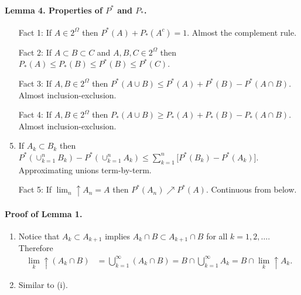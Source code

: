 \documentclass[10pt,letterpaper]{article}
\begin{document}
\paragraph{Lemma 4. Properties of $P^*$ and $P_*$.}
\begin{enumerate}
\item[Fact 1:] If $A\in 2^\Omega$ then $P^* (A) + P_*(A^c) = 1$. Almost the complement rule.
\item[Fact 2:]  If $A\subset B\subset C$ and $A, B, C\in2^\Omega$ then 
$P_* (A)\leq P_*(B)\leq P^*(B)\leq P^*(C)$.
\item[Fact 3:]  If $A, B\in 2^\Omega$ then $P^*(A\cup B)\leq P^*(A) + P^*(B) - P^*(A\cap B)$. Almost inclusion-exclusion.
\item[Fact 4:]  If $A, B\in 2^\Omega$ then $P_*(A\cup B)\geq P_*(A) + P_*(B) - P_*(A\cap B)$.  Almost inclusion-exclusion.
\item If $A_k\subset B_k$ then $P^*(\cup_{k=1}^n B_k) - P^*(\cup_{k=1}^n 
A_k)\leq \sum_{k=1}^n \bigl[P^*(B_k) - P^*(A_k)\bigr]$. Approximating unions term-by-term.
\item[Fact 5:] If $\lim_n\!\!\uparrow A_n= A$ then $P^*(A_n)\nearrow P^*(A)$. Continuous from below.
\end{enumerate}

\newpage
\paragraph{Proof of Lemma 1.}
\begin{enumerate}
\item
 Notice that $A_k \subset A_{k+1}$ implies $ A_k\cap B \subset A_{k+1}\cap B$ for all $k=1,2,\ldots$. Therefore
\begin{align*}
 \lim_k\!\!\uparrow (A_k\cap B) &= \bigcup_{k=1}^\infty (A_k\cap B) = B\cap \bigcup_{k=1}^\infty A_k = B\cap\lim_k\!\!\uparrow A_k.
\end{align*} 
\item Similar to (i). 
\end{enumerate}

\end{document}
